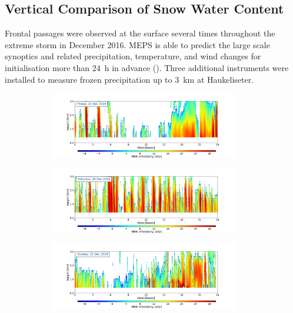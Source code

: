 \subsection{Vertical Comparison of Snow Water Content}
\label{sec:res:large_scale_vert}
Frontal passages were observed at the surface several times throughout the extreme storm in December 2016. MEPS is able to predict the large scale synoptics and related precipitation, temperature, and wind changes for initialisation more than \SI{24}{\hour} in advance (). Three additional instruments were installed %
to measure frozen precipitation up to \SI{3}{\km} at Haukeliseter. 
\begin{figure}[H]
	\centering
	\begin{subfigure}[t]{\textwidth}
		\centering
		\includegraphics[trim={4.cm 2.5cm 4.5cm 1.5cm},clip,width=0.91\textwidth]{./fig_MRR_refl/MRR_20161223}
		\caption{}\label{fig:ret:refl23}
	\end{subfigure}
	\begin{subfigure}[t]{\textwidth}
		\centering
		\includegraphics[trim={4.cm 2.5cm 4.5cm 1.5cm},clip,width=0.91\textwidth]{./fig_MRR_refl/MRR_20161224}
		\caption{}\label{fig:ret:refl24}
	\end{subfigure}
	\begin{subfigure}[t]{\textwidth}
		\centering
		\includegraphics[trim={4.cm 2.5cm 4.5cm 1.5cm},clip,width=0.91\textwidth]{./fig_MRR_refl/MRR_20161225}

\end{subfigure}
\end{figure}
